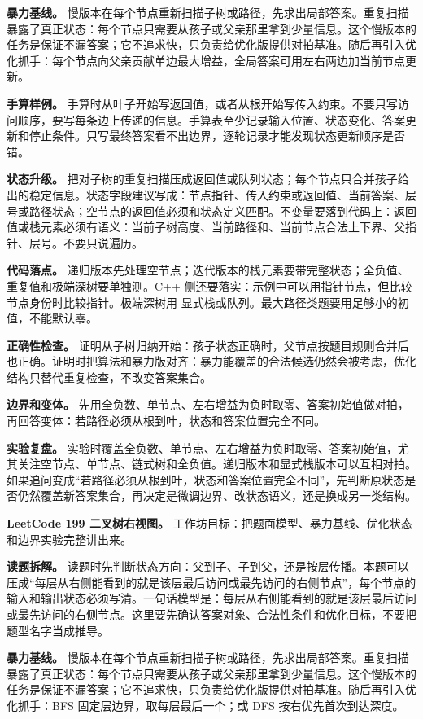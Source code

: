\textbf{暴力基线。} 慢版本在每个节点重新扫描子树或路径，先求出局部答案。重复扫描暴露了真正状态：每个节点只需要从孩子或父亲那里拿到少量信息。这个慢版本的任务是保证不漏答案；它不追求快，只负责给优化版提供对拍基准。随后再引入优化抓手：每个节点向父亲贡献单边最大增益，全局答案可用左右两边加当前节点更新。

\textbf{手算样例。} 手算时从叶子开始写返回值，或者从根开始写传入约束。不要只写访问顺序，要写每条边上传递的信息。手算表至少记录输入位置、状态变化、答案更新和停止条件。只写最终答案看不出边界，逐轮记录才能发现状态更新顺序是否错。

\textbf{状态升级。} 把对子树的重复扫描压成返回值或队列状态；每个节点只合并孩子给出的稳定信息。状态字段建议写成：节点指针、传入约束或返回值、当前答案、层号或路径状态；空节点的返回值必须和状态定义匹配。不变量要落到代码上：返回值或栈元素必须有语义：当前子树高度、当前路径和、当前节点合法上下界、父指针、层号。不要只说遍历。

\textbf{代码落点。} 递归版本先处理空节点；迭代版本的栈元素要带完整状态；全负值、重复值和极端深树要单独测。C++ 侧还要落实：示例中可以用指针节点，但比较节点身份时比较指针。极端深树用  显式栈或队列。最大路径类题要用足够小的初值，不能默认零。

\textbf{正确性检查。} 证明从子树归纳开始：孩子状态正确时，父节点按题目规则合并后也正确。证明时把算法和暴力版对齐：暴力能覆盖的合法候选仍然会被考虑，优化结构只替代重复检查，不改变答案集合。

\textbf{边界和变体。} 先用全负数、单节点、左右增益为负时取零、答案初始值做对拍，再回答变体：若路径必须从根到叶，状态和答案位置完全不同。

\textbf{实验复盘。} 实验时覆盖全负数、单节点、左右增益为负时取零、答案初始值，尤其关注空节点、单节点、链式树和全负值。递归版本和显式栈版本可以互相对拍。如果追问变成“若路径必须从根到叶，状态和答案位置完全不同”，先判断原状态是否仍然覆盖新答案集合，再决定是微调边界、改状态语义，还是换成另一类结构。

\noindent\textbf{LeetCode 199 二叉树右视图。} 工作坊目标：把题面模型、暴力基线、优化状态和边界实验完整讲出来。

\textbf{读题拆解。} 读题时先判断状态方向：父到子、子到父，还是按层传播。本题可以压成“每层从右侧能看到的就是该层最后访问或最先访问的右侧节点”，每个节点的输入和输出状态必须写清。一句话模型是：每层从右侧能看到的就是该层最后访问或最先访问的右侧节点。这里要先确认答案对象、合法性条件和优化目标，不要把题型名字当成推导。

\textbf{暴力基线。} 慢版本在每个节点重新扫描子树或路径，先求出局部答案。重复扫描暴露了真正状态：每个节点只需要从孩子或父亲那里拿到少量信息。这个慢版本的任务是保证不漏答案；它不追求快，只负责给优化版提供对拍基准。随后再引入优化抓手：BFS 固定层边界，取每层最后一个；或 DFS 按右优先首次到达深度。

